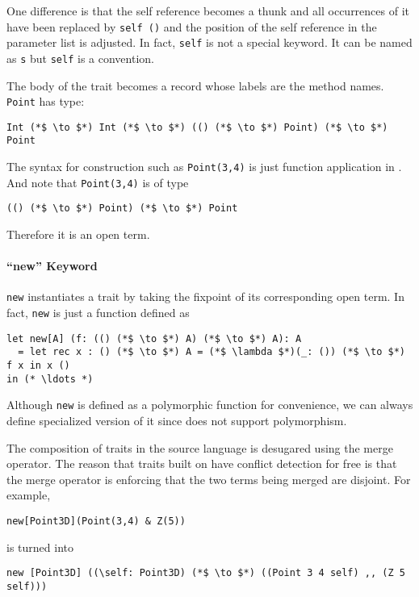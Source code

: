 One difference is that the self reference becomes a thunk and all occurrences of
it have been replaced by \lstinline$self ()$ and the position of the self
reference in the parameter list is adjusted. In fact, \lstinline$self$ is not a
special keyword. It can be named as \lstinline$s$ but \lstinline$self$ is a
convention.

The body of the trait becomes a record whose labels are the method names.
\lstinline$Point$ has type:

\begin{lstlisting}
Int (*$ \to $*) Int (*$ \to $*) (() (*$ \to $*) Point) (*$ \to $*) Point
\end{lstlisting}

The syntax for construction such as \lstinline$Point(3,4)$ is just function
application in \name. And note that \lstinline$Point(3,4)$ is of type
\begin{lstlisting}
(() (*$ \to $*) Point) (*$ \to $*) Point
\end{lstlisting}

Therefore it is an open term.

\paragraph{``new'' Keyword} \lstinline$new$ instantiates a trait by taking the
fixpoint of its corresponding open term. In fact, \lstinline$new$ is just a
function defined as

\begin{lstlisting}
let new[A] (f: (() (*$ \to $*) A) (*$ \to $*) A): A
  = let rec x : () (*$ \to $*) A = (*$ \lambda $*)(_: ()) (*$ \to $*) f x in x ()
in (* \ldots *)
\end{lstlisting}

Although \lstinline$new$ is defined as
a polymorphic function for convenience, we can always define specialized version
of it since \name does not support polymorphism.

The composition of traits in the source language is desugared using the merge
operator. The reason that traits built on \name have conflict detection for free
is that the merge operator is enforcing that the two terms being merged are
disjoint. For example,

\begin{lstlisting}
new[Point3D](Point(3,4) & Z(5))
\end{lstlisting}

is turned into

\begin{lstlisting}
new [Point3D] ((\self: Point3D) (*$ \to $*) ((Point 3 4 self) ,, (Z 5 self)))
\end{lstlisting}

